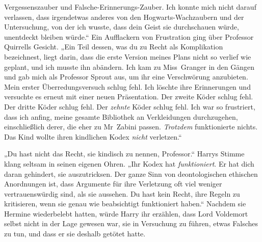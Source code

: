 Vergessenszauber und Falsche-Erinnerungs-Zauber. Ich konnte mich nicht darauf verlassen, dass irgendetwas anderes von den Hogwarts-Wachzaubern und der Untersuchung, von der ich wusste, dass dein Geist sie durchschauen würde, unentdeckt bleiben würde.“
Ein Aufflackern von Frustration ging über Professor Quirrells Gesicht.
„Ein Teil dessen, was du zu Recht als Komplikation bezeichnest, liegt darin, dass die erste Version meines Plans nicht so verlief wie geplant, und ich musste ihn abändern. Ich kam zu Miss~Granger in den Gängen und gab mich als Professor Sprout aus, um ihr eine Verschwörung anzubieten. Mein erster Überredungsversuch schlug fehl. Ich löschte ihre Erinnerungen und versuchte es erneut mit einer neuen Präsentation. Der zweite Köder schlug fehl. Der dritte Köder schlug fehl. Der \emph{zehnte} Köder schlug fehl. Ich war so frustriert, dass ich anfing, meine gesamte Bibliothek an Verkleidungen durchzugehen, einschließlich derer, die eher zu Mr~Zabini passen. \emph{Trotzdem} funktionierte nichts. Das Kind wollte ihren kindlichen Kodex \emph{nicht} verletzen.“

„Du hast nicht das Recht, sie kindisch zu nennen, Professor.“
Harrys Stimme klang seltsam in seinen eigenen Ohren.
„Ihr Kodex hat \emph{funktioniert}. Er hat dich daran gehindert, sie auszutricksen. Der ganze Sinn von deontologischen ethischen Anordnungen ist, dass Argumente für ihre Verletzung oft viel weniger vertrauenswürdig sind, als sie aussehen. Du hast kein Recht, ihre Regeln zu kritisieren, wenn sie genau wie beabsichtigt funktioniert haben.“
Nachdem sie Hermine wiederbelebt hatten, würde Harry ihr erzählen, dass Lord Voldemort selbst nicht in der Lage gewesen war, sie in Versuchung zu führen, etwas Falsches zu tun, und dass er sie deshalb getötet hatte.

